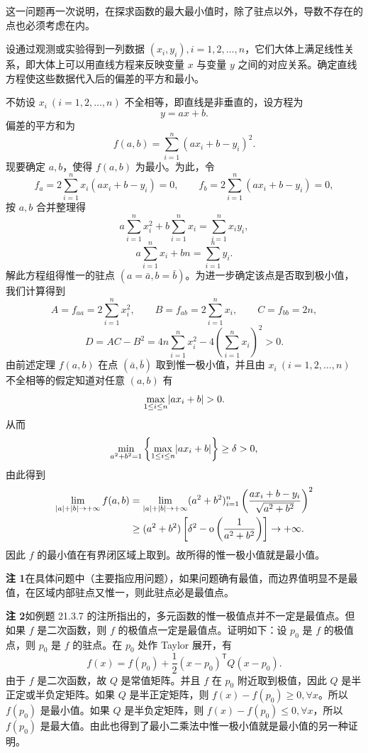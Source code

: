 \begin{xremark}
这一问题再一次说明，在探求函数的最大最小值时，除了驻点以外，导数不存在的点也必须考虑在内。
\end{xremark}

\begin{xexample}[21.3.10（最小二乘法）]
设通过观测或实验得到一列数据 $(x_i,y_i),i=1,2,\ldots,n$，它们大体上满足线性关系，即大体上可以用直线方程来反映变量 $x$ 与变量 $y$ 之间的对应关系。确定直线方程使这些数据代入后的偏差的平方和最小。
\end{xexample}
\begin{xsolution}
不妨设 $x_i\ (i=1,2,\ldots,n)$ 不全相等，即直线是非垂直的，设方程为
\[
  y=ax+b.
\]
偏差的平方和为
\[
  f(a,b)=\sum_{i=1}^n(ax_i+b-y_i)^2.
\]
现要确定 $a,b$，使得 $f(a,b)$ 为最小。为此，令
\[
  f_a=2\sum_{i=1}^n x_i(ax_i+b-y_i)=0,
  \qquad
  f_b=2\sum_{i=1}^n(ax_i+b-y_i)=0,
\]
按 $a,b$ 合并整理得
\[
  a\sum_{i=1}^n x_i^2+b\sum_{i=1}^n x_i=\sum_{i=1}^n x_iy_i,
\]
\[
  a\sum_{i=1}^n x_i+bn=\sum_{i=1}^n y_i.
\]
解此方程组得惟一的驻点 $(a=\bar a,b=\bar b)$。为进一步确定该点是否取到极小值，我们计算得到
\[
  A=f_{aa}=2\sum_{i=1}^n x_i^2,
  \qquad
  B=f_{ab}=2\sum_{i=1}^n x_i,
  \qquad
  C=f_{bb}=2n,
\]
\[
  D=AC-B^2=4n\sum_{i=1}^n x_i^2-4\left(\sum_{i=1}^n x_i\right)^2>0.
\]
由前述定理 $f(a,b)$ 在点 $(\bar a,\bar b)$ 取到惟一极小值，并且由 $x_i\ (i=1,2,\ldots,n)$ 不全相等的假定知道对任意 $(a,b)$ 有
\[
  \max_{1\le i\le n}\lvert ax_i+b\rvert>0.
\]
从而
\[
  \min_{a^2+b^2=1}\left\{\max_{1\le i\le n}\lvert ax_i+b\rvert\right\}\ge\delta>0,
\]
由此得到
\[
\begin{aligned}
  \lim_{\lvert a\rvert+\lvert b\rvert\to+\infty}f(a,b)
  &=\lim_{\lvert a\rvert+\lvert b\rvert\to+\infty}
  (a^2+b^2)\relax_{i=1}^n
  \left(\frac{ax_i+b-y_i}{\sqrt{a^2+b^2}}\right)^2\\
  &\ge(a^2+b^2)\left[\delta^2-\mathrm{o}\left(\frac1{a^2+b^2}\right)\right]\to+\infty.
\end{aligned}
\]
因此 $f$ 的最小值在有界闭区域上取到。故所得的惟一极小值就是最小值。
\end{xsolution}
\begin{xremark}
\textbf{注 1}\quad 在具体问题中（主要指应用问题），如果问题确有最值，而边界值明显不是最值，在区域内部驻点又惟一，则此驻点必是最值点。

\textbf{注 2}\quad 如例题 21.3.7 的注所指出的，多元函数的惟一极值点并不一定是最值点。但如果 $f$ 是二次函数，则 $f$ 的极值点一定是最值点。证明如下：设 $p_0$ 是 $f$ 的极值点，则 $p_0$ 是 $f$ 的驻点。在 $p_0$ 处作 Taylor 展开，有
\[
  f(x)=f(p_0)+\frac12(x-p_0)^{\mathsf T}Q(x-p_0).
\]
由于 $f$ 是二次函数，故 $Q$ 是常值矩阵。并且 $f$ 在 $p_0$ 附近取到极值，因此 $Q$ 是半正定或半负定矩阵。如果 $Q$ 是半正定矩阵，则 $f(x)-f(p_0)\ge0,\forall x$。所以 $f(p_0)$ 是最小值。如果 $Q$ 是半负定矩阵，则 $f(x)-f(p_0)\le0,\forall x$，所以 $f(p_0)$ 是最大值。由此也得到了最小二乘法中惟一极小值就是最小值的另一种证明。
\end{xremark}

